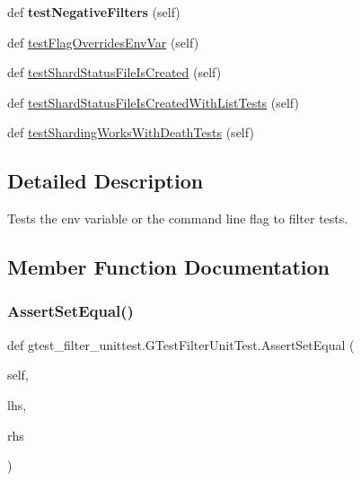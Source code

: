 \begin{DoxyCompactItemize}
def {\bfseries test\+Negative\+Filters} (self)
\item 
def \mbox{\hyperlink{classgtest__filter__unittest_1_1GTestFilterUnitTest_a81e4256da0e0ad8cb4b764ffd573cc6d}{test\+Flag\+Overrides\+Env\+Var}} (self)
\item 
def \mbox{\hyperlink{classgtest__filter__unittest_1_1GTestFilterUnitTest_a7a2c7b8d758abba0ae883bbb272f344b}{test\+Shard\+Status\+File\+Is\+Created}} (self)
\item 
def \mbox{\hyperlink{classgtest__filter__unittest_1_1GTestFilterUnitTest_a1dac68948f6170e39ae9ee7bca0bc1eb}{test\+Shard\+Status\+File\+Is\+Created\+With\+List\+Tests}} (self)
\item 
def \mbox{\hyperlink{classgtest__filter__unittest_1_1GTestFilterUnitTest_a4b4f7428d9219dff5960968477927626}{test\+Sharding\+Works\+With\+Death\+Tests}} (self)
\end{DoxyCompactItemize}


\subsection{Detailed Description}
\begin{DoxyVerb}Tests the env variable or the command line flag to filter tests.\end{DoxyVerb}
 

\subsection{Member Function Documentation}
\mbox{\label{classgtest__filter__unittest_1_1GTestFilterUnitTest_aeebdbdcc59594ad0a69cf11eafe94997}} 
\subsubsection{\texorpdfstring{Assert\+Set\+Equal()}{AssertSetEqual()}}
{\footnotesize\ttfamily def gtest\+\_\+filter\+\_\+unittest.\+G\+Test\+Filter\+Unit\+Test.\+Assert\+Set\+Equal (\begin{DoxyParamCaption}\item[{}]{self,  }\item[{}]{lhs,  }\item[{}]{rhs }\end{DoxyParamCaption})}

